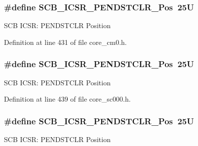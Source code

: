 \subsubsection[{\texorpdfstring{S\+C\+B\+\_\+\+I\+C\+S\+R\+\_\+\+P\+E\+N\+D\+S\+T\+C\+L\+R\+\_\+\+Pos}{SCB_ICSR_PENDSTCLR_Pos}}]{\setlength{\rightskip}{0pt plus 5cm}\#define S\+C\+B\+\_\+\+I\+C\+S\+R\+\_\+\+P\+E\+N\+D\+S\+T\+C\+L\+R\+\_\+\+Pos~25U}\hypertarget{group___c_m_s_i_s___s_c_b_gadbe25e4b333ece1341beb1a740168fdc}{}\label{group___c_m_s_i_s___s_c_b_gadbe25e4b333ece1341beb1a740168fdc}
S\+CB I\+C\+SR\+: P\+E\+N\+D\+S\+T\+C\+LR Position 

Definition at line 431 of file core\+\_\+cm0.\+h.

\subsubsection[{\texorpdfstring{S\+C\+B\+\_\+\+I\+C\+S\+R\+\_\+\+P\+E\+N\+D\+S\+T\+C\+L\+R\+\_\+\+Pos}{SCB_ICSR_PENDSTCLR_Pos}}]{\setlength{\rightskip}{0pt plus 5cm}\#define S\+C\+B\+\_\+\+I\+C\+S\+R\+\_\+\+P\+E\+N\+D\+S\+T\+C\+L\+R\+\_\+\+Pos~25U}\hypertarget{group___c_m_s_i_s___s_c_b_gadbe25e4b333ece1341beb1a740168fdc}{}\label{group___c_m_s_i_s___s_c_b_gadbe25e4b333ece1341beb1a740168fdc}
S\+CB I\+C\+SR\+: P\+E\+N\+D\+S\+T\+C\+LR Position 

Definition at line 439 of file core\+\_\+sc000.\+h.

\subsubsection[{\texorpdfstring{S\+C\+B\+\_\+\+I\+C\+S\+R\+\_\+\+P\+E\+N\+D\+S\+T\+C\+L\+R\+\_\+\+Pos}{SCB_ICSR_PENDSTCLR_Pos}}]{\setlength{\rightskip}{0pt plus 5cm}\#define S\+C\+B\+\_\+\+I\+C\+S\+R\+\_\+\+P\+E\+N\+D\+S\+T\+C\+L\+R\+\_\+\+Pos~25U}\hypertarget{group___c_m_s_i_s___s_c_b_gadbe25e4b333ece1341beb1a740168fdc}{}\label{group___c_m_s_i_s___s_c_b_gadbe25e4b333ece1341beb1a740168fdc}
S\+CB I\+C\+SR\+: P\+E\+N\+D\+S\+T\+C\+LR Position 

